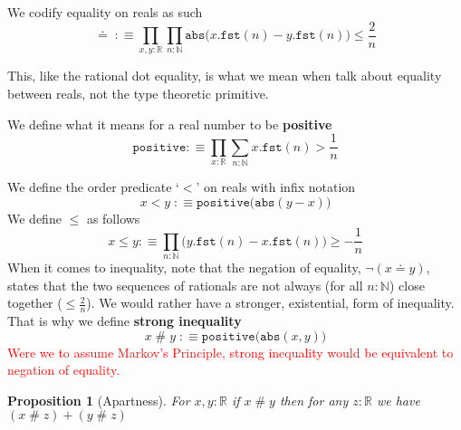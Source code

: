 \documentclass[12pt]{report}
\newcommand\todo[1]{\textcolor{red}{#1}}
\newtheorem{prop}[thm]{Proposition}
\begin{document}
We codify equality on reals as such
$$\doteq\;:\equiv \prod_{x,y : \mathbb{R}} \prod_{n : \mathbb{N}} \mathtt{abs}\big( x.\mathtt{fst}(n) - y.\mathtt{fst}(n)\big) \leq \frac{2}{n}$$

This, like the rational dot equality, is what we mean when talk about equality between reals, not the type theoretic primitive. 

We define what it means for a real number to be \textbf{positive}
$$\mathtt{positive} :\equiv \prod_{x: \mathbb{R}} \sum_{n : \mathbb{N}} x.\mathtt{fst}(n) > \frac{1}{n}$$

We define the order predicate `$<$' on reals with infix notation
$$x<y\; :\equiv \mathtt{positive}\big( \mathtt{abs}(y-x) \big)$$
We define $\leq$ as follows
$$x \leq y :\equiv \prod_{n : \mathbb{N}} \big( y.\mathtt{fst}(n) - x.\mathtt{fst}(n) \big) \geq -\frac{1}{n}$$
When it comes to inequality, note that the negation of equality, $\neg (x \doteq y)$, states that the two sequences of rationals are not always (for all $n :\mathbb{N}$) close together ($\leq \frac{2}{n}$). 
We would rather have a stronger, existential, form of inequality. 
That is why we define \textbf{strong inequality}
$$x\;\#\; y\; :\equiv \mathtt{positive}\big( \mathtt{abs}(x,y)\big)$$
\todo{Were we to assume Markov's Principle, strong inequality would be equivalent to negation of equality. }
\begin{prop}[Apartness]
For $x,y : \mathbb{R}$ if $x\;\#\;y$ then for any $z:\mathbb{R}$ we have $(x\;\#\;z) + (y\;\#\;z)$
\end{prop}

\printbibliography
\end{document}
